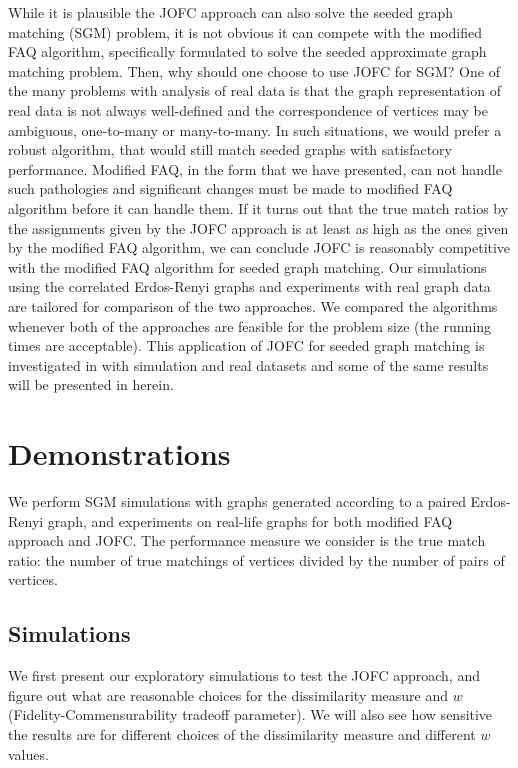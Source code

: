 \documentclass[12pt,oneside,final]{thesis}\usepackage[]{graphicx}\usepackage[]{color}
\begin{document}
 While it is plausible the JOFC approach can also solve the seeded graph matching (SGM) problem, it is not obvious it can compete with the modified FAQ algorithm, specifically formulated to solve the  seeded approximate graph matching problem. Then, why should one choose to use JOFC for SGM? One of the many problems with analysis of real data is that the graph representation of real data is not always well-defined and the correspondence of vertices may be  ambiguous, one-to-many or many-to-many. In such situations, we would prefer a robust algorithm, that would still match seeded graphs with satisfactory performance. Modified FAQ, in the form that we have presented, can not handle such pathologies and significant changes must be made to modified FAQ algorithm before it can handle them. If it turns out that the true match ratios by the assignments given by the JOFC approach is at least as high as the ones given by the modified FAQ algorithm, we can conclude JOFC is reasonably competitive with the modified FAQ algorithm for seeded graph matching. Our simulations using the correlated Erdos-Renyi graphs and experiments with real graph data are tailored for comparison of  the two approaches. We compared the algorithms whenever both of the approaches   are  feasible for the problem size (the running times are acceptable). This application of JOFC for seeded graph matching is  investigated  in \cite{SGMviaJOFC} with simulation and real datasets and some of the same results will be presented in herein.
 

 
 \section{Demonstrations}

We perform SGM simulations with graphs generated according to a paired Erdos-Renyi graph, and experiments on real-life graphs for  both modified FAQ approach and JOFC. The performance measure we consider is the true match ratio: the number of true matchings of vertices  divided by the number of pairs of vertices.

\subsection{Simulations}


  We first present our exploratory simulations to  test the JOFC approach, and figure out what are reasonable choices for  the dissimilarity measure and $w$ (Fidelity-Commensurability tradeoff parameter). We will also  see how sensitive the results are for different choices of the dissimilarity measure and different $w$ values. 
  
\end{document}
